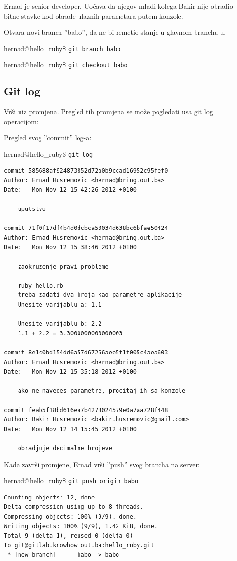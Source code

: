 \documentclass[times, utf8, seminar]{fit}
\begin{document}
Ernad je senior developer. Uočava da njegov mladi kolega Bakir nije obradio bitne stavke kod obrade ulaznih parametara putem konzole.

Otvara novi branch ''babo'', da ne bi remetio stanje u glavnom branchu-u.

hernad@hello\_ruby\$ \texttt{git branch babo}

hernad@hello\_ruby\$ \texttt{git checkout babo}

\subsection{Git log}

Vrši niz promjena. Pregled tih promjena se može pogledati usa git log operacijom:

Pregled svog ''commit'' log-a:

hernad@hello\_ruby\$ \texttt{git log}
\begin{lstlisting}
commit 585688af924873852d72a0b9ccad16952c95fef0
Author: Ernad Husremovic <hernad@bring.out.ba>
Date:   Mon Nov 12 15:42:26 2012 +0100

    uputstvo

commit 71f0f17df4b4d0dcbca50034d638bc6bfae50424
Author: Ernad Husremovic <hernad@bring.out.ba>
Date:   Mon Nov 12 15:38:46 2012 +0100

    zaokruzenje pravi probleme
    
    ruby hello.rb
    treba zadati dva broja kao parametre aplikacije
    Unesite varijablu a: 1.1
    
    Unesite varijablu b: 2.2
    1.1 + 2.2 = 3.3000000000000003

commit 8e1c0bd154dd6a57d67266aee5f1f005c4aea603
Author: Ernad Husremovic <hernad@bring.out.ba>
Date:   Mon Nov 12 15:35:18 2012 +0100

    ako ne navedes parametre, procitaj ih sa konzole

commit feab5f18bd616ea7b4278024579e0a7aa728f448
Author: Bakir Husremovic <bakir.husremovic@gmail.com>
Date:   Mon Nov 12 14:15:45 2012 +0100

    obradjuje decimalne brojeve
\end{lstlisting}

Kada završi promjene, Ernad vrši ''push'' svog brancha na server:

hernad@hello\_ruby\$ \texttt{git push origin babo}
\begin{lstlisting}
Counting objects: 12, done.
Delta compression using up to 8 threads.
Compressing objects: 100% (9/9), done.
Writing objects: 100% (9/9), 1.42 KiB, done.
Total 9 (delta 1), reused 0 (delta 0)
To git@gitlab.knowhow.out.ba:hello_ruby.git
 * [new branch]      babo -> babo
\end{lstlisting}
\end{document}
